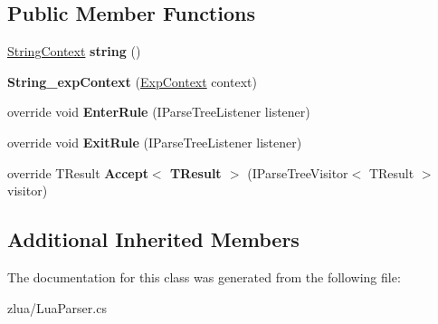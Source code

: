 \subsection*{Public Member Functions}
\begin{DoxyCompactItemize}
\item 
\mbox{\label{classzlua_1_1_lua_parser_1_1_string__exp_context_a727280e753827f259efd77e6920894f7}} 
\mbox{\hyperlink{classzlua_1_1_lua_parser_1_1_string_context}{String\+Context}} {\bfseries string} ()
\item 
\mbox{\label{classzlua_1_1_lua_parser_1_1_string__exp_context_a949a308fb638b1f9379d52e1373eb434}} 
{\bfseries String\+\_\+exp\+Context} (\mbox{\hyperlink{classzlua_1_1_lua_parser_1_1_exp_context}{Exp\+Context}} context)
\item 
\mbox{\label{classzlua_1_1_lua_parser_1_1_string__exp_context_a293b3c3ab123b10168acd112131fbec8}} 
override void {\bfseries Enter\+Rule} (I\+Parse\+Tree\+Listener listener)
\item 
\mbox{\label{classzlua_1_1_lua_parser_1_1_string__exp_context_a11f2bb5c3607514026c7232e7db5184c}} 
override void {\bfseries Exit\+Rule} (I\+Parse\+Tree\+Listener listener)
\item 
\mbox{\label{classzlua_1_1_lua_parser_1_1_string__exp_context_a581cde0f55f2b75ffe6a079ae5b39ee4}} 
override T\+Result {\bfseries Accept$<$ T\+Result $>$} (I\+Parse\+Tree\+Visitor$<$ T\+Result $>$ visitor)
\end{DoxyCompactItemize}
\subsection*{Additional Inherited Members}


The documentation for this class was generated from the following file\+:\begin{DoxyCompactItemize}
\item 
zlua/Lua\+Parser.\+cs\end{DoxyCompactItemize}
